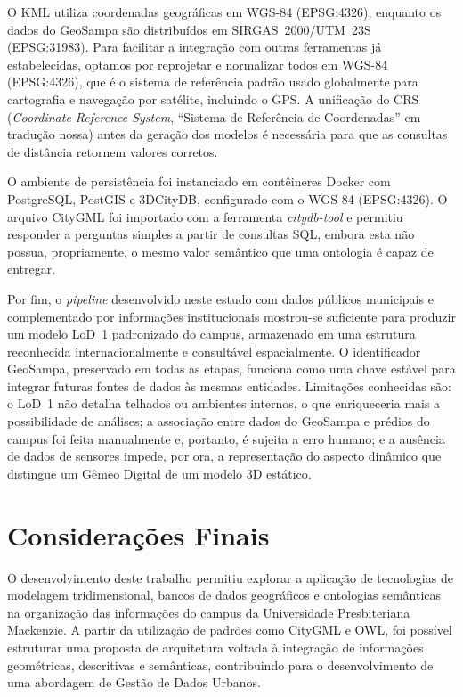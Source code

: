 \documentclass[
  article,   %
  11pt,      %
  oneside,   %
  a4paper,   %
  english,   %
  brazil,    %
  sumario=tradicional
]{abntex2}
\newcommand{\en}[1]{\foreignlanguage{english}{\textit{#1}}}
\begin{document}
O KML utiliza coordenadas geográficas em WGS-84 (EPSG:4326), enquanto os dados do GeoSampa são
distribuídos em SIRGAS~2000/UTM~23S (EPSG:31983).
Para facilitar a integração com outras ferramentas já estabelecidas, optamos por reprojetar e
normalizar todos em WGS-84 (EPSG:4326), que é o sistema de referência padrão usado globalmente para
cartografia e navegação por satélite, incluindo o GPS.
A unificação do CRS (\en{Coordinate Reference System}, ``Sistema de Referência de Coordenadas'' em
tradução nossa) antes da geração dos modelos é necessária para que as consultas de distância
retornem valores corretos.

O ambiente de persistência foi instanciado em contêineres Docker com PostgreSQL, PostGIS e
3DCityDB, configurado com o WGS-84 (EPSG:4326).
O arquivo CityGML foi importado com a ferramenta \textit{citydb-tool} e permitiu responder a
perguntas simples a partir de consultas SQL, embora esta não possua, propriamente, o mesmo valor
semântico que uma ontologia é capaz de entregar.

Por fim, o \en{pipeline} desenvolvido neste estudo com dados públicos municipais e complementado
por informações institucionais mostrou-se suficiente para produzir um modelo LoD~1 padronizado do
campus, armazenado em uma estrutura reconhecida internacionalmente e consultável espacialmente.
O identificador GeoSampa, preservado em todas as etapas, funciona como uma chave estável para
integrar futuras fontes de dados às mesmas entidades.
Limitações conhecidas são: o LoD~1 não detalha telhados ou ambientes internos, o que enriqueceria
mais a possibilidade de análises; a associação entre dados do GeoSampa e prédios do campus foi
feita manualmente e, portanto, é sujeita a erro humano; e a ausência de dados de sensores impede,
por ora, a representação do aspecto dinâmico que distingue um Gêmeo Digital de um modelo 3D
estático.

\section{Considerações Finais}

O desenvolvimento deste trabalho permitiu explorar a aplicação de tecnologias de modelagem
tridimensional, bancos de dados geográficos e ontologias semânticas na organização das informações
do campus da Universidade Presbiteriana Mackenzie.
A partir da utilização de padrões como CityGML e OWL, foi possível estruturar uma proposta de
arquitetura voltada à integração de informações geométricas, descritivas e semânticas, contribuindo
para o desenvolvimento de uma abordagem de Gestão de Dados Urbanos.
\end{document}
